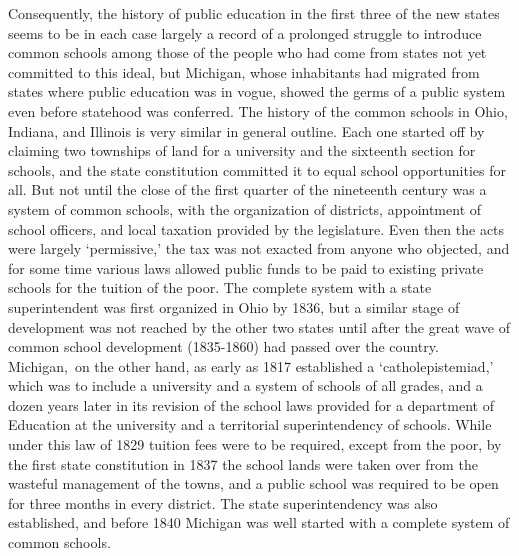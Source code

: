 \documentclass[]{book}
\begin{document}
Consequently, the history of public education in the first three of the new states seems to be in each case largely a record of a prolonged struggle to introduce common schools among those of the people who had come from states not yet committed to this ideal, but Michigan, whose inhabitants had migrated from states where public education was in vogue, showed the germs of a public system even before statehood was conferred. The history of the common schools in Ohio, Indiana, and Illinois is very similar in general outline. Each one started off by claiming two townships of land for a university and the sixteenth section for schools, and the state constitution committed it to equal school opportunities for all. But not until the close of the first quarter of the nineteenth century was a system of common schools, with the organization of districts, appointment of school officers, and local taxation provided by the legislature. Even then the acts were largely `permissive,' the tax was not exacted from anyone who objected, and for some time various laws allowed public funds to be paid to existing private schools for the tuition of the poor. The complete system with a state superintendent was first organized in Ohio by 1836, but a similar stage of development was not reached by the other two states until after the great wave of common school development (1835-1860) had passed over the country. Michigan,~on the other hand, as early as 1817 established a `catholepistemiad,' which was to include a university and a system of schools of all grades, and a dozen years later in its revision of the school laws provided for a department of Education at the university and a territorial superintendency of schools. While under this law of 1829 tuition fees were to be required, except from the poor, by the first state constitution in 1837 the school lands were taken over from the wasteful management of the towns, and a public school was required to be open for three months in every district. The state superintendency was also established, and before 1840 Michigan was well started with a complete system of common schools.
\end{document}
